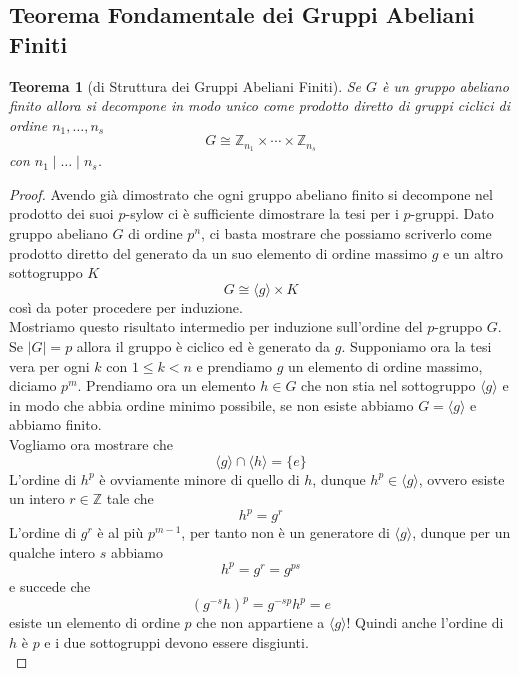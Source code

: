 \documentclass[a4paper]{article}
\newtheorem{theorem}{Teorema}[section]
\theoremstyle{remark}
\theoremstyle{definition}
\begin{document}
\subsection{Teorema Fondamentale dei Gruppi Abeliani Finiti}
\begin{multicols}{2}
\begin{theorem}[di Struttura dei Gruppi Abeliani Finiti]\label{tfgaf}
	Se $ G $ è un gruppo abeliano finito allora si decompone in modo unico come prodotto diretto di gruppi ciclici di ordine $ n_1, \dots, n_s $ \[ G \cong \mathbb{Z}_{n_1} \times \cdots \times \mathbb{Z}_{n_s} \] con $ n_1 \mid \dots \mid n_s $.
\end{theorem}
\begin{proof}
	Avendo già dimostrato che ogni gruppo abeliano finito si decompone nel prodotto dei suoi $ p $-sylow ci è sufficiente dimostrare la tesi per i $ p $-gruppi. Dato gruppo abeliano $ G $ di ordine $ p^n $, ci basta mostrare che possiamo scriverlo come prodotto diretto del generato da un suo elemento di ordine massimo $ g $ e un altro sottogruppo $ K $
	\[ G \cong \langle g \rangle \times K \]
	così da poter procedere per induzione. \\
	
	Mostriamo questo risultato intermedio per induzione sull'ordine del $ p $-gruppo $ G $. Se $ |G|=p $ allora il gruppo è ciclico ed è generato da $ g $. Supponiamo ora la tesi vera per ogni $ k $ con $ 1 \leq k < n $ e prendiamo $ g $ un elemento di ordine massimo, diciamo $ p^m $. Prendiamo ora un elemento $ h \in G  $ che non stia nel sottogruppo $ \langle g \rangle $ e in modo che abbia ordine minimo possibile, se non esiste abbiamo $ G = \langle g \rangle $ e abbiamo finito. \\
	
	Vogliamo ora mostrare che 
	\[ \langle g \rangle \cap \langle h \rangle = \{e\} \]
	L'ordine di $ h^p $ è ovviamente minore di quello di $ h $, dunque $ h^p \in \langle g \rangle $, ovvero esiste un intero $ r \in \mathbb{Z} $ tale che
	\[ h^p = g^r \]
	L'ordine di $ g^r $ è al più $ p^{m-1} $, per tanto non è un generatore di $ \langle g \rangle $, dunque per un qualche intero $ s $ abbiamo
	\[ h^p = g^r = g^{ps} \]
	e succede che 
	\[ (g^{-s}h)^p = g^{-sp}h^p = e \]
	esiste un elemento di ordine $ p $ che non appartiene a $ \langle g \rangle $! Quindi anche l'ordine di $ h $ è $ p $ e i due sottogruppi devono essere disgiunti. \\
	

\end{proof}
\end{multicols}
\end{document}
